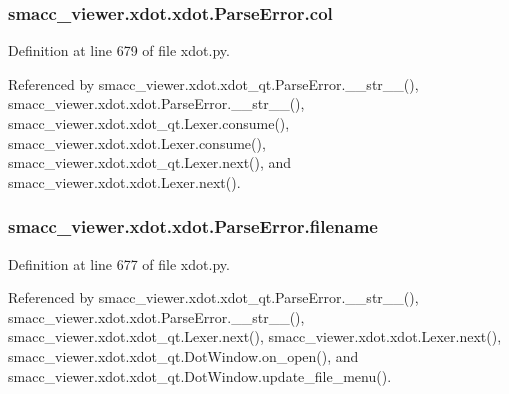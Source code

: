 \subsubsection[{\texorpdfstring{col}{col}}]{\setlength{\rightskip}{0pt plus 5cm}smacc\+\_\+viewer.\+xdot.\+xdot.\+Parse\+Error.\+col}\hypertarget{classsmacc__viewer_1_1xdot_1_1xdot_1_1ParseError_ad05fe80da8e8cead11744886782e19d8}{}\label{classsmacc__viewer_1_1xdot_1_1xdot_1_1ParseError_ad05fe80da8e8cead11744886782e19d8}


Definition at line 679 of file xdot.\+py.



Referenced by smacc\+\_\+viewer.\+xdot.\+xdot\+\_\+qt.\+Parse\+Error.\+\_\+\+\_\+str\+\_\+\+\_\+(), smacc\+\_\+viewer.\+xdot.\+xdot.\+Parse\+Error.\+\_\+\+\_\+str\+\_\+\+\_\+(), smacc\+\_\+viewer.\+xdot.\+xdot\+\_\+qt.\+Lexer.\+consume(), smacc\+\_\+viewer.\+xdot.\+xdot.\+Lexer.\+consume(), smacc\+\_\+viewer.\+xdot.\+xdot\+\_\+qt.\+Lexer.\+next(), and smacc\+\_\+viewer.\+xdot.\+xdot.\+Lexer.\+next().

\subsubsection[{\texorpdfstring{filename}{filename}}]{\setlength{\rightskip}{0pt plus 5cm}smacc\+\_\+viewer.\+xdot.\+xdot.\+Parse\+Error.\+filename}\hypertarget{classsmacc__viewer_1_1xdot_1_1xdot_1_1ParseError_a90306db99316d7fa8ea0c22dd4d7b4e1}{}\label{classsmacc__viewer_1_1xdot_1_1xdot_1_1ParseError_a90306db99316d7fa8ea0c22dd4d7b4e1}


Definition at line 677 of file xdot.\+py.



Referenced by smacc\+\_\+viewer.\+xdot.\+xdot\+\_\+qt.\+Parse\+Error.\+\_\+\+\_\+str\+\_\+\+\_\+(), smacc\+\_\+viewer.\+xdot.\+xdot.\+Parse\+Error.\+\_\+\+\_\+str\+\_\+\+\_\+(), smacc\+\_\+viewer.\+xdot.\+xdot\+\_\+qt.\+Lexer.\+next(), smacc\+\_\+viewer.\+xdot.\+xdot.\+Lexer.\+next(), smacc\+\_\+viewer.\+xdot.\+xdot\+\_\+qt.\+Dot\+Window.\+on\+\_\+open(), and smacc\+\_\+viewer.\+xdot.\+xdot\+\_\+qt.\+Dot\+Window.\+update\+\_\+file\+\_\+menu().

